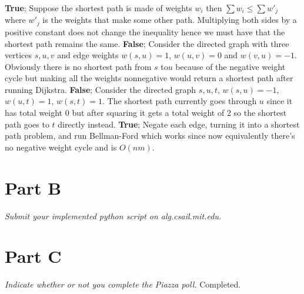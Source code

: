 \documentclass[12pt,twoside]{article}
\begin{document}
\begin{problems}
\problem
\begin{problemparts}
\problempart \textbf{True}; Suppose the shortest path is made of weights $w_i$ then $\sum w_i \leq \sum w'_j$ where $w'_j$ is the weights that make some other path. Multiplying both sides by a positive constant does not change the inequality hence we must have that the shortest path remains the same.
\problempart \textbf{False}; Consider the directed graph with three vertices $s,u,v$ and edge weights $w(s,u)=1$, $w(u,v)=0$ and $w(v,u)=-1$. Obviously there is no shortest path from $s$ to$u$ because of the negative weight cycle but making all the weights nonnegative would return a shortest path after running Dijkstra. 
\problempart \textbf{False}; Consider the directed graph $s,u,t$, $w(s,u)=-1$, $w(u,t)=1$, $w(s,t)=1$. The shortest path currently goes through $u$ since it has total weight $0$ but after squaring it gets a total weight of $2$ so the shortest path goes to $t$ directly instead.
\problempart \textbf{True}; Negate each edge, turning it into a shortest path problem, and run Bellman-Ford which works since now equivalently there's no negative weight cycle and is $O(nm)$.
\end{problemparts}
\section*{Part B}

\emph{Submit your implemented python script on alg.csail.mit.edu.}

\section*{Part C}

\emph{Indicate whether or not you complete the Piazza poll.}
Completed.
\end{problems}
\end{document}
